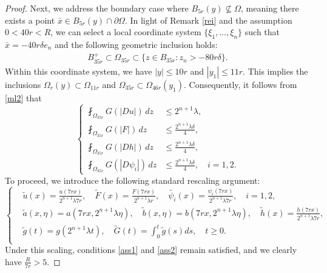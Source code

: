 \documentclass[10pt,a4paper]{amsart}
\begin{document}
\begin{proof}
 	
 	Next, we address the boundary case where $B_{5r}(y) \nsubseteq \Omega$, meaning there exists a point $\bar{x} \in B_{5r}(y) \cap \partial\Omega$. In light of Remark \ref{rei} and the assumption $0 < 40r < R$, we can select a local coordinate system $\{\xi_1, \ldots, \xi_n\}$ such that $\bar{x} = -40r\delta e_n$ and the following geometric inclusion holds:
 	\begin{align}\label{rei2}
 		B^+_{35r}\subset \Omega_{35r}
 		\subset
 		\{z\in B_{35r}:z_n>-80r\delta\}.
 	\end{align}
 	Within this coordinate system, we have $|y| \leq 10r$ and $|y_1| \leq 11r$. This implies the inclusions $\Omega_r(y) \subset \Omega_{11r}$ and $\Omega_{35r} \subset \Omega_{46r}(y_1)$. Consequently, it follows from \eqref{ml2} that
 		\begin{equation}\label{rei3}
 		\left\{
 		\begin{aligned}
 			 	\fint_{\Omega_{35r}}G(|Du|)\,dz
 			 &\leq 2^{n+1}\lambda, \\[0.15cm]
 		 \fint_{\Omega_{35r}}G(|F|)\,dz
 		 &\leq \frac{2^{n+1}\lambda\delta}{4}, \\[0.15cm]
 		 \fint_{\Omega_{35r}}G(|Dh|)\,dz
 		 &\leq \frac{2^{n+1}\lambda\delta}{4}, \\[0.15cm]
 		 \fint_{\Omega_{35r}}G(|D\psi_i|)\,dz
 		 &\leq \frac{2^{n+1}\lambda\delta}{4}, \quad i=1,2.
 		\end{aligned}
 		\right.
 	\end{equation}
 	To proceed, we introduce the following standard rescaling argument:
 	\begin{equation*} 
 		\left\{
 		\begin{aligned}
 			&\tilde{u}(x) = \frac{u(7rx)}{2^{n+1} \lambda 7r}, \quad \tilde{F}(x) = \frac{F( 7rx)}{2^{n+1} \lambda r},  \quad \tilde{\psi_i}(x) = \frac{\psi_i(7 rx)}{2^{n+1} \lambda 7r}, \quad  i=1,2, \\[0.15cm]
 			&\tilde{a}(x,\eta) = a(7 rx,2^{n+1} \lambda \eta), \quad 	\tilde{b}(x,\eta) = b( 7rx,2^{n+1}\lambda \eta), \quad \tilde{h}(x) = \frac{h(7 rx)}{2^{n+1} \lambda 7r},   \\[0.15cm]
 			&\tilde{g}(t) = g(2^{n+1}\lambda t), \quad \tilde{G}(t) =\int_0^t \tilde{g}(s) ds, \quad t \geq 0.  \\[0.15cm]
 		\end{aligned}
 		\right.
 	\end{equation*} 
 	Under this scaling, conditions \eqref{ass1} and \eqref{ass2} remain satisfied, and we clearly have $\frac{R}{7r} > 5$.

\end{proof}
\end{document}
